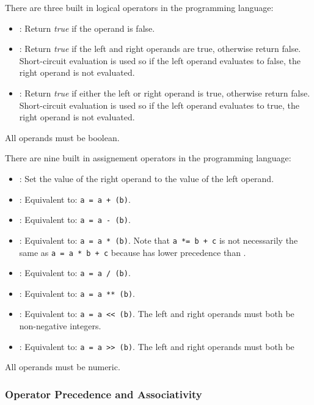 There are three built in logical operators in the \ModLang programming language:
\begin{itemize}
\item \textbf{\opex{!}}: Return \emph{true} if the operand is false.
\item \textbf{\oper{\&\&}}: Return \emph{true} if the left and right operands are true, otherwise return
  false.  Short-circuit evaluation is used so if the left operand evaluates to false, the right operand is
  not evaluated.
\item \textbf{\oper{||}}: Return \emph{true} if either the left or right operand is true, otherwise return
  false. Short-circuit evaluation is used so if the left operand evaluates to true, the right operand is not
  evaluated.
\end{itemize}
All operands must be boolean.

There are nine built in assignement operators in the \ModLang programming language:
\begin{itemize}
\item \textbf{\oper{=}}: Set the value of the right operand to the value of the left operand.
\item \textbf{\oper{+=}}: Equivalent to: \texttt{a = a + (b)}.
\item \textbf{\oper{-=}}: Equivalent to: \texttt{a = a - (b)}.
\item \textbf{\oper{*=}}: Equivalent to: \texttt{a = a * (b)}.  Note that \texttt{a *= b + c} is not necessarily the same
  as \texttt{a = a * b + c} because \oper{*=} has lower precedence than \oper{+}.
\item \textbf{\oper{/=}}: Equivalent to: \texttt{a = a / (b)}.
\item \textbf{\oper{**=}}: Equivalent to: \texttt{a = a ** (b)}.
\item \textbf{\oper{<<=}}: Equivalent to: \texttt{a = a << (b)}.  The left and right operands must both be
  non-negative integers.
\item \textbf{\oper{>>=}}: Equivalent to: \texttt{a = a >> (b)}.  The left and right operands must both be
\end{itemize}
All operands must be numeric.


\subsubsection{Operator Precedence and Associativity}

